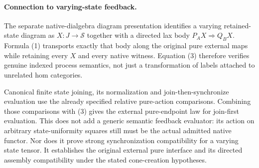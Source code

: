 \documentclass{article}
\begin{document}
\paragraph{Connection to varying-state feedback.} The separate native-dialgebra diagram presentation identifies a varying retained-state diagram as $X:J\to\mathcal S$ together with a directed lax body $P_AX\Rightarrow Q_BX$. Formula (1) transports exactly that body along the original pure external maps while retaining every $X$ and every native witness. Equation (3) therefore verifies genuine indexed process semantics, not just a transformation of labels attached to unrelated hom categories.

Canonical finite state joining, its normalization and join-then-synchronize evaluation use the already specified relative pure-action comparisons. Combining those comparisons with (3) gives the external pure-endpoint law for join-first evaluation. This does not add a generic semantic feedback evaluator: its action on arbitrary state-uniformity squares still must be the actual admitted native functor. Nor does it prove strong synchronization compatibility for a varying state tensor. It establishes the original external pure interface and its directed assembly compatibility under the stated cone-creation hypotheses.
\end{document}
